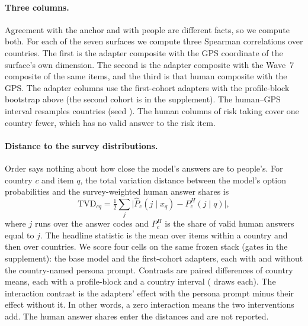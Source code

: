 \paragraph{Three columns.} Agreement with the anchor and with people are different facts, so we compute both. For each of the seven surfaces we compute three Spearman correlations over countries. The first is the adapter composite with the GPS coordinate of the surface's own dimension. The second is the adapter composite with the Wave~7 composite of the same items, and the third is that human composite with the GPS. The adapter columns use the first-cohort adapters with the profile-block bootstrap above (the second cohort is in the supplement). The human--GPS interval resamples countries (seed ). The human columns of risk taking cover one country fewer, which has no valid answer to the risk item.

\paragraph{Distance to the survey distributions.} Order says nothing about how close the model's answers are to people's. For country $c$ and item $q$, the total variation distance between the model's option probabilities and the survey-weighted human answer shares is
\begin{equation*}
\mathrm{TVD}_{cq}=\tfrac{1}{2}\sum_j \bigl|\widehat{P}_c(j\mid x_q)-P^{H}_c(j\mid q)\bigr|,
\end{equation*}
where $j$ runs over the answer codes and $P^{H}_c$ is the share of valid human answers equal to $j$. The headline statistic is the mean over items within a country and then over countries. We score four cells on the same frozen stack (gates in the supplement): the base model and the first-cohort adapters, each with and without the country-named persona prompt. Contrasts are paired differences of country means, each with a profile-block and a country interval ( draws each). The interaction contrast is the adapters' effect with the persona prompt minus their effect without it. In other words, a zero interaction means the two interventions add. The human answer shares enter the distances and are not reported.
